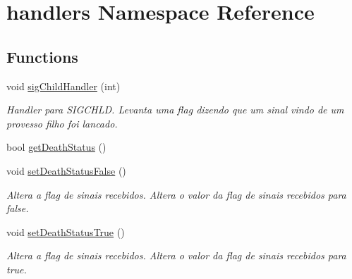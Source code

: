 \hypertarget{namespacehandlers}{
\section{handlers Namespace Reference}
\label{namespacehandlers}
}
\subsection*{Functions}
\begin{DoxyCompactItemize}
\item 
void \hyperlink{namespacehandlers_aa02fd1a028b7cfc01ccb52b9f70cb624}{sigChildHandler} (int)
\begin{DoxyCompactList}\small\item\em Handler para SIGCHLD. Levanta uma flag dizendo que um sinal vindo de um provesso filho foi lancado. \item\end{DoxyCompactList}\item 
bool \hyperlink{namespacehandlers_a7f732d800eb51bf0ee24d554ce770276}{getDeathStatus} ()
\item 
void \hyperlink{namespacehandlers_a254dfa6abeed4136e566fd013aa9fdc4}{setDeathStatusFalse} ()
\begin{DoxyCompactList}\small\item\em Altera a flag de sinais recebidos. Altera o valor da flag de sinais recebidos para false. \item\end{DoxyCompactList}\item 
void \hyperlink{namespacehandlers_a06dc78ff46f5dcc7fb9c09a495caf4ff}{setDeathStatusTrue} ()
\begin{DoxyCompactList}\small\item\em Altera a flag de sinais recebidos. Altera o valor da flag de sinais recebidos para true. \item\end{DoxyCompactList}\end{DoxyCompactItemize}


